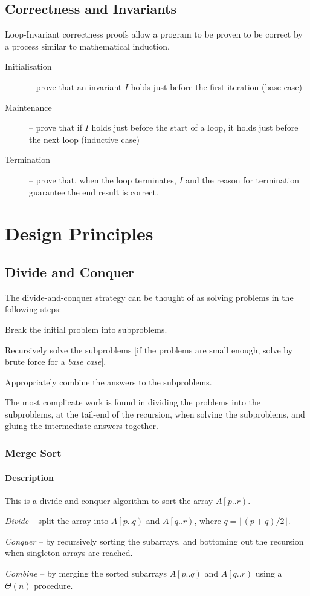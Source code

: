 \documentclass[10pt]{article}
\begin{document}
\subsection{Correctness and Invariants}
Loop-Invariant correctness proofs allow a program to be proven to be correct by a process similar to mathematical induction.
\begin{description}
	\item[Initialisation] -- prove that an invariant $I$ holds just before the first iteration (base case)
	\item[Maintenance] -- prove that if $I$ holds just before the start of a loop, it holds just before the next loop (inductive case)
	\item[Termination] -- prove that, when the loop terminates, $I$ and the reason for termination guarantee the end result is correct.
\end{description}
\section{Design Principles}
\subsection{Divide and Conquer}
The divide-and-conquer strategy can be thought of as solving problems in the following steps:
\begin{enumerate*}
\item Break the initial problem into subproblems.
\item Recursively solve the subproblems [if the problems are small enough, solve by brute force for a \emph{base case}].
\item Appropriately combine the answers to the subproblems.
\end{enumerate*}
The most complicate work is found in dividing the problems into the subproblems, at the tail-end of the recursion, when solving the subproblems, and gluing the intermediate answers together.
\subsubsection{Merge Sort}
\paragraph{Description}
This is a divide-and-conquer algorithm to sort the array $A\left[p..r\right)$.
\begin{enumerate*}
\item \emph{Divide} -- split the array into $A\left[p..q\right)$ and $A\left[q..r\right)$, where $q=\lfloor(p+q)/2\rfloor$.
\item \emph{Conquer} -- by recursively sorting the subarrays, and bottoming out the recursion when singleton arrays are reached.
\item \emph{Combine} -- by merging the sorted subarrays $A\left[p..q\right)$ and $A\left[q..r\right)$ using a $\Theta(n)$ procedure.
\end{enumerate*}
\end{document}
